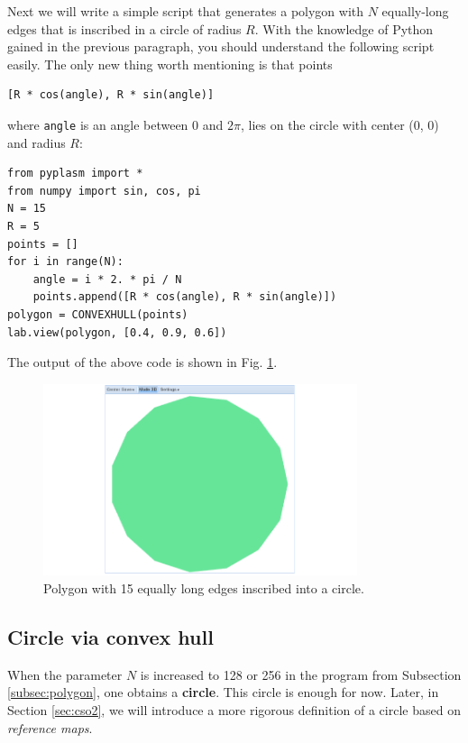 \documentclass{article}
\begin{document}
Next we will write a simple script that generates 
a polygon with $N$ equally-long edges that is inscribed in 
a circle of radius $R$. With the knowledge of Python 
gained in the previous paragraph, you should understand 
the following script easily. The only new thing worth 
mentioning is that points 

\begin{verbatim}
[R * cos(angle), R * sin(angle)]
\end{verbatim}
where {\tt angle} is an angle between $0$ and $2\pi$, lies
on the circle with center (0, 0) and radius $R$:

\begin{verbatim}
from pyplasm import *
from numpy import sin, cos, pi
N = 15
R = 5
points = []
for i in range(N):
    angle = i * 2. * pi / N
    points.append([R * cos(angle), R * sin(angle)])
polygon = CONVEXHULL(points)
lab.view(polygon, [0.4, 0.9, 0.6])
\end{verbatim}
The output of the above code is shown in Fig. \ref{fig:convexhull-1}.

\newpage

\begin{figure}[!ht]
\begin{center}
\includegraphics[width=0.82\textwidth]{img/convexhull-1.png}
\end{center}
\vspace{-2mm}
\caption{Polygon with 15 equally long edges inscribed into a circle.}
\label{fig:convexhull-1}
\end{figure}

\subsection{Circle via convex hull}\label{par:cico}

When the parameter $N$ is increased to 128 or 256 in the program from 
Subsection \ref{subsec:polygon}, one obtains a {\bf circle}. This 
circle is enough for now. Later, in Section \ref{sec:cso2}, we will 
introduce a more rigorous definition of a circle based on {\em reference 
maps}. 
\end{document}
